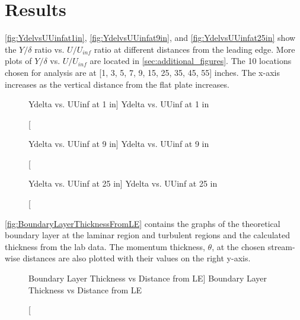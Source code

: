 \chapter{Results}
\label{cp:results}

\noindent \autoref{fig:YdelvsUUinfat1in}, \autoref{fig:YdelvsUUinfat9in}, and \autoref{fig:YdelvsUUinfat25in} show the $Y/\delta$ ratio vs. $U/U_{inf}$ ratio at different distances from the leading edge. More plots of $Y/\delta$ vs. $U/U_{inf}$ are located in \autoref{sec:additional_figures}. The 10 locations chosen for analysis are at [1, 3, 5, 7, 9, 15, 25, 35, 45, 55] inches. The x-axis increases as the vertical distance from the flat plate increases.

\begin{figure}[htpb]
    \centering
     
     \caption
     [Ydelta vs. UUinf at 1 in]
     {Ydelta vs. UUinf at 1 in}
     \label{fig:YdelvsUUinfat1in}
\end{figure}

\begin{figure}[htpb]
    \centering
     
     \caption
     [Ydelta vs. UUinf at 9 in]
     {Ydelta vs. UUinf at 9 in}
     \label{fig:YdelvsUUinfat9in}
\end{figure}

\begin{figure}[htpb]
    \centering
     
     \caption
     [Ydelta vs. UUinf at 25 in]
     {Ydelta vs. UUinf at 25 in}
     \label{fig:YdelvsUUinfat25in}
\end{figure}

\noindent \autoref{fig:BoundaryLayerThicknessFromLE} contains the graphs of the theoretical boundary layer at the laminar region and turbulent regions and the calculated thickness from the lab data. The momentum thickness, $\theta$, at the chosen stream-wise distances are also plotted with their values on the right y-axis.

\begin{figure}[htpb]
    \centering
     
     \caption
     [Boundary Layer Thickness vs Distance from LE]
     {Boundary Layer Thickness vs Distance from LE}
     \label{fig:BoundaryLayerThicknessFromLE}
\end{figure}

